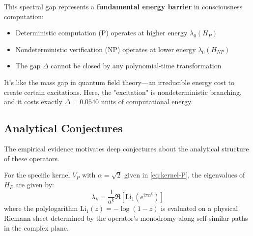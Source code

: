 \begin{keyidea}
This spectral gap represents a \textbf{fundamental energy barrier} in consciousness computation:

\begin{itemize}
\item Deterministic computation (P) operates at higher energy $\lambda_0(H_P)$
\item Nondeterministic verification (NP) operates at lower energy $\lambda_0(H_{NP})$
\item The gap $\Delta$ cannot be closed by any polynomial-time transformation
\end{itemize}

It's like the mass gap in quantum field theory—an irreducible energy cost to create certain excitations. Here, the "excitation" is nondeterministic branching, and it costs exactly $\Delta = 0.0540$ units of computational energy.
\end{keyidea}

\subsection{Analytical Conjectures}

The empirical evidence motivates deep conjectures about the analytical structure of these operators.

\begin{conjecture}\label{conj:polylog-spectrum}
For the specific kernel $V_P$ with $\alpha = \sqrt{2}$ given in \eqref{eq:kernel-P}, the eigenvalues of $H_P$ are given by:
\begin{equation}
\lambda_k = \frac{1}{a^k} \Re\left[\mathrm{Li}_1\left(e^{i\pi \alpha^k}\right)\right]
\end{equation}
where the polylogarithm $\mathrm{Li}_1(z) = -\log(1-z)$ is evaluated on a physical Riemann sheet determined by the operator's monodromy along self-similar paths in the complex plane.
\end{conjecture}

